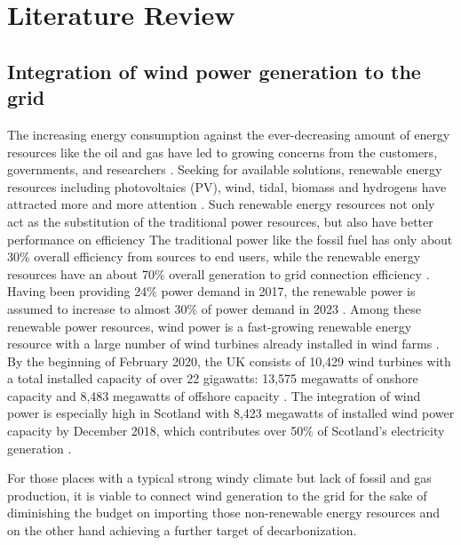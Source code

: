\documentclass[12pt,a4paper]{report}
\begin{document}
        \section{Literature Review}
        \subsection{Integration of wind power generation to the grid}
        The increasing energy consumption against the ever-decreasing amount of
        energy resources like the oil and gas have led to
        growing concerns from the customers, governments, and researchers \cite{book:ahuja_2015} \cite{book:miller_spoolman_2008}.
        Seeking for available solutions, renewable energy resources including
        photovoltaics (PV), wind, tidal, biomass and hydrogens have attracted
        more and more attention \cite{website:runyon_2019}. Such renewable energy resources not only act as the substitution of the traditional power resources,
        but also have better performance on efficiency The traditional power like the fossil fuel has only about 30\% overall efficiency from sources to end users, while the renewable energy resources have an about 70\% overall generation to grid connection efficiency \cite{paper:renewableefficiency}. 
        Having been providing 24\% power demand in 2017, the renewable power is assumed to increase to almost 30\% of power demand in 2023 \cite{website:iea}.
        Among these renewable power resources, wind power is a fast-growing
        renewable energy resource with a large number of wind turbines already
        installed in wind farms \cite{website:energytrendsUK}. %
        By the beginning of February 2020, the UK consists of 10,429 wind turbines with a total installed capacity of over 22 gigawatts: 13,575 megawatts of onshore capacity and 8,483 megawatts of offshore capacity \cite{website:UKWindPower}.
        The integration of wind power is especially high in Scotland with 8,423 megawatts of installed wind power capacity by December 2018, which contributes over 50\% of Scotland's electricity generation \cite{website:scotlandGovRenewableTarget} \cite{website:renewableenergyworld_2019}.

        For those places with a typical strong windy climate but lack of fossil and gas production, 
        it is viable to connect wind generation to the grid for the sake of diminishing the budget on importing those non-renewable 
        energy resources and on the other hand achieving a further target of decarbonization.
        
\end{document}
